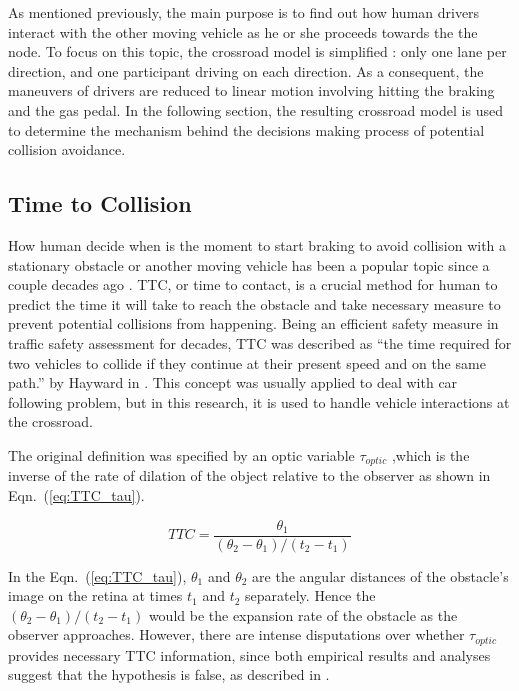 As mentioned previously, the main purpose is to find out how human drivers interact with the other moving vehicle as he or she proceeds towards the the node. To focus on this topic, the crossroad model is simplified : only one lane per direction, and one participant driving on each direction. As a consequent, the maneuvers of drivers are reduced to linear motion involving hitting the braking and the gas pedal.  In the following section, the resulting crossroad model is used to determine the mechanism behind the decisions making process of potential collision avoidance.



\subsection{Time to Collision}
\label{sub:TTC}

How human decide when is the moment to start braking to avoid collision with a stationary obstacle or another moving vehicle has been a popular topic since a couple decades ago \cite{Caird1994}. \ac{TTC}, or time to contact, is a crucial method for human to predict the time it will take to reach the obstacle and take necessary measure to prevent potential collisions from happening. Being an efficient safety measure in traffic safety assessment for decades, TTC was described as “the time required for two vehicles to collide if they continue at their present speed and on the same path.” by Hayward in \cite{Hayward1972}. This concept was usually applied to deal with car following problem, but in this research, it is used to handle vehicle interactions at the crossroad.

The original definition was specified by an optic variable $\tau_{optic}$ ,which is the inverse of the rate of dilation of the object relative to the observer as shown in Eqn.~(\ref{eq:TTC_tau}). 

\begin{equation}
TTC = \frac{\theta_1}{(\theta_2 - \theta_1)/(t_2 - t_1)}
\label{eq:TTC_tau}
\end{equation}

In the Eqn.~(\ref{eq:TTC_tau}), $\theta_1$ and $\theta_2$ are the angular distances of the obstacle's image on the retina at times $t_1$ and $t_2$ separately. Hence the $(\theta_2 - \theta_1)/(t_2 - t_1)$ would be the expansion rate of the obstacle as the observer approaches. However, there are intense disputations over whether $\tau_{optic}$ provides necessary TTC information, since both empirical results and analyses suggest that the hypothesis is false, as described in \cite{tau}. 

